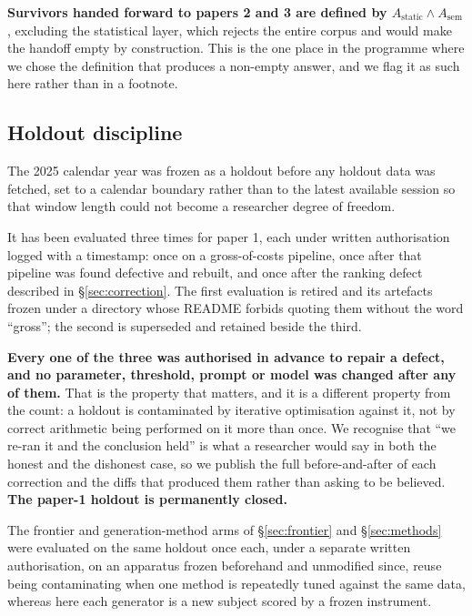 \documentclass[11pt,a4paper]{article}
\begin{document}
\textbf{Survivors handed forward to papers 2 and 3 are defined by
$A_{\mathrm{static}} \wedge A_{\mathrm{sem}}$}, excluding the statistical layer, which rejects
the entire corpus and would make the handoff empty by construction. This is the one place in the
programme where we chose the definition that produces a non-empty answer, and we flag it as such
here rather than in a footnote.

\subsection{Holdout discipline}

The 2025 calendar year was frozen as a holdout before any holdout data was fetched, set to a
calendar boundary rather than to the latest available session so that window length could not
become a researcher degree of freedom.

It has been evaluated three times for paper 1, each under written authorisation logged with a
timestamp: once on a gross-of-costs pipeline, once after that pipeline was found defective and
rebuilt, and once after the ranking defect described in \S\ref{sec:correction}. The first
evaluation is retired and its artefacts frozen under a directory whose README forbids quoting them
without the word ``gross''; the second is superseded and retained beside the third.

\textbf{Every one of the three was authorised in advance to repair a defect, and no parameter,
threshold, prompt or model was changed after any of them.} That is the property that matters, and
it is a different property from the count: a holdout is contaminated by iterative optimisation
against it, not by correct arithmetic being performed on it more than once. We recognise that
``we re-ran it and the conclusion held'' is what a researcher would say in both the honest and the
dishonest case, so we publish the full before-and-after of each correction and the diffs that
produced them rather than asking to be believed. \textbf{The paper-1 holdout is permanently closed.}

The frontier and generation-method arms of \S\ref{sec:frontier} and \S\ref{sec:methods} were
evaluated on the same holdout once each, under a separate written authorisation, on an apparatus
frozen beforehand and unmodified since, reuse being contaminating when one method is repeatedly
tuned against the same data, whereas here each generator is a new subject scored by a frozen
instrument.

\end{document}
